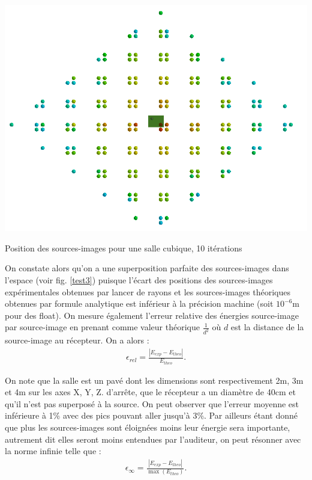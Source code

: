 \begin{figureth}
		\includegraphics[width=\linewidth]{images/test3_0}
		\caption{Position des sources-images pour une salle cubique, 10 itérations}
		\label{test3}
	\end{figureth}

On constate alors qu'on a une superposition parfaite des sources-images dans l'espace (voir fig. \ref{test3}) puisque l'écart des positions des sources-images expérimentales obtenues par lancer de rayons et les sources-images théoriques obtenues par formule analytique est inférieur à la précision machine (soit $10^{-6}$m pour des float). On mesure également l'erreur relative des énergies source-image par source-image en prenant comme valeur théorique $\frac{1}{d^2}$ où $d$ est la distance de la source-image au récepteur. On a alors :
\begin{align}
\epsilon_{rel} = \frac{|E_{exp}-E_{theo}|}{E_{theo}}.
\end{align}

On note que la salle est un pavé dont les dimensions sont respectivement 2m, 3m et 4m sur les axes X, Y, Z. d'arrête, que le récepteur a un diamètre de 40cm et qu'il n'est pas superposé à la source. On peut observer que l'erreur moyenne est inférieure à 1\% avec des pics pouvant aller jusqu'à 3\%. Par ailleurs étant donné que plus les sources-images sont éloignées moins leur énergie sera importante, autrement dit elles seront moins entendues par l'auditeur, on peut résonner avec la norme infinie telle que :
\begin{align}
\epsilon_{\infty} = \frac{|E_{exp}-E_{theo}|}{\max(E_{theo})}.
\end{align}

